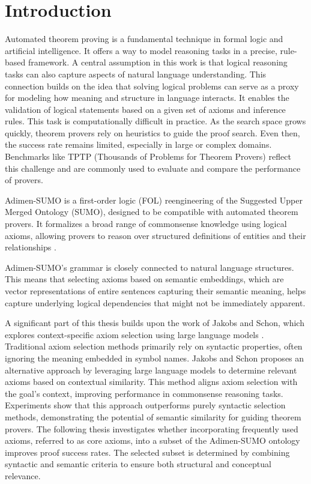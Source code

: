 \documentclass[english,version-2020-11]{uzl-thesis}
\begin{document}
%
%

\chapter{Introduction}
\label{chapter-introduction}

Automated theorem proving is a fundamental technique in formal logic and artificial intelligence. It offers a way to model reasoning tasks in a precise, rule-based framework. A central assumption in this work is that logical reasoning tasks can also capture aspects of natural language understanding. This connection builds on the idea that solving logical problems can serve as a proxy for modeling how meaning and structure in language interacts. It enables the validation of logical statements based on a given set of axioms and inference rules. This task is computationally difficult in practice. As the search space grows quickly, theorem provers rely on heuristics to guide the proof search. Even then, the success rate remains limited, especially in large or complex domains. Benchmarks like TPTP (Thousands of Problems for Theorem Provers) reflect this challenge and are commonly used to evaluate and compare the performance of provers.

Adimen-SUMO is a first-order logic (FOL) reengineering of the Suggested Upper Merged Ontology (SUMO), designed to be compatible with automated theorem provers. It formalizes a broad range of commonsense knowledge using logical axioms, allowing provers to reason over structured definitions of entities and their relationships \cite{Alvez2014}.

Adimen-SUMO’s grammar is closely connected to natural language structures. This means that selecting axioms based on semantic embeddings, which are vector representations of entire sentences capturing their semantic meaning, helps capture underlying logical dependencies that might not be immediately apparent.

A significant part of this thesis builds upon the work of Jakobs and Schon, which explores context-specific axiom selection using large language models \cite{Schon2024}. Traditional axiom selection methods primarily rely on syntactic properties, often ignoring the meaning embedded in symbol names. Jakobs and Schon proposes an alternative approach by leveraging large language models to determine relevant axioms based on contextual similarity. This method aligns axiom selection with the goal's context, improving performance in commonsense reasoning tasks. Experiments show that this approach outperforms purely syntactic selection methods, demonstrating the potential of semantic similarity for guiding theorem provers.
\newpage
The following thesis investigates whether incorporating frequently used axioms, referred to as core axioms, into a subset of the Adimen-SUMO ontology improves proof success rates. The selected subset is determined by combining syntactic and semantic criteria to ensure both structural and conceptual relevance.
\end{document}
